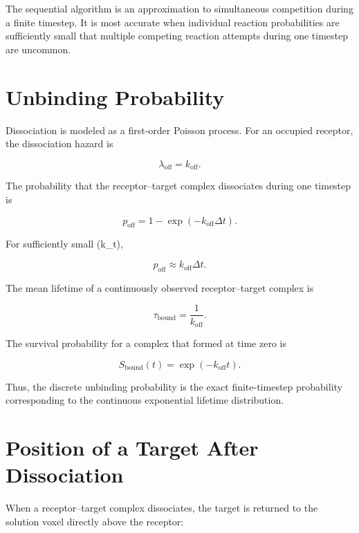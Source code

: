 \documentclass[11pt]{article}
\begin{document}
The sequential algorithm is an approximation to simultaneous competition during a finite timestep. It is most accurate when individual reaction probabilities are sufficiently small that multiple competing reaction attempts during one timestep are uncommon.

\section{Unbinding Probability}

Dissociation is modeled as a first-order Poisson process. For an occupied receptor, the dissociation hazard is

\begin{equation}
\lambda_{\mathrm{off}}
=
k_{\mathrm{off}}.
\end{equation}

The probability that the receptor--target complex dissociates during one timestep is

\begin{equation}
\boxed{
p_{\mathrm{off}}
=
1-\exp(-k_{\mathrm{off}}\Delta t)
}.
\end{equation}

For sufficiently small (k_{}\Delta t),

\begin{equation}
p_{\mathrm{off}}
\approx
k_{\mathrm{off}}\Delta t.
\end{equation}

The mean lifetime of a continuously observed receptor--target complex is

\begin{equation}
\tau_{\mathrm{bound}}
=
\frac{1}{k_{\mathrm{off}}}.
\end{equation}

The survival probability for a complex that formed at time zero is

\begin{equation}
S_{\mathrm{bound}}(t)
=
\exp(-k_{\mathrm{off}}t).
\end{equation}

Thus, the discrete unbinding probability is the exact finite-timestep probability corresponding to the continuous exponential lifetime distribution.

\section{Position of a Target After Dissociation}

When a receptor--target complex dissociates, the target is returned to the solution voxel directly above the receptor:
\end{document}
